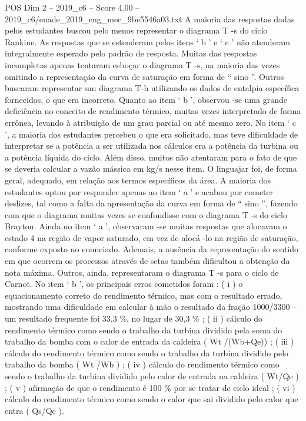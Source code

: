 \begin{textsample}{POS Dim 2 – 2019\_c6 – Score 4.00 – 2019\_c6/enade\_2019\_eng\_mec\_9be5546a03.txt}
A maioria das respostas dadas pelos estudantes buscou pelo menos representar o diagrama T -s do ciclo Rankine.
As respostas que se estenderam pelos itens ‘ b ’ e ‘ c ’ não atenderam integralmente esperado pelo padrão de resposta.
Muitas das respostas incompletas apenas tentaram esboçar o diagrama T -s, na maioria das vezes omitindo a representação da curva de saturação em forma de “ sino ”.
Outros buscaram representar um diagrama T-h utilizando os dados de entalpia específica fornecidos, o que era incorreto.
Quanto ao item ‘ b ’, observou -se uma grande deficiência no conceito de rendimento térmico, muitas vezes interpretado de forma errônea, levando à atribuição de um grau parcial ou até mesmo zero.
No item ‘ c ’, a maioria dos estudantes percebeu o que era solicitado, mas teve dificuldade de interpretar se a potência a ser utilizada nos cálculos era a potência da turbina ou a potência líquida do ciclo.
Além disso, muitos não atentaram para o fato de que se deveria calcular a vazão mássica em kg/s nesse item.
O linguajar foi, de forma geral, adequado, em relação aos termos específicos da área.
A maioria dos estudantes optou por responder apenas ao item ‘ a ’ e acabou por cometer deslizes, tal como a falta da apresentação da curva em forma de “ sino ”, fazendo com que o diagrama muitas vezes se confundisse com o diagrama T -s do ciclo Brayton.
Ainda no item ‘ a ’, observaram -se muitas respostas que alocavam o estado 4 na região de vapor saturado, em vez de alocá -lo na região de saturação, conforme exposto no enunciado.
Ademais, a ausência da representação do sentido em que ocorrem os processos através de setas também dificultou a obtenção da nota máxima.
Outros, ainda, representaram o diagrama T -s para o ciclo de Carnot.
No item ‘ b ’, os principais erros cometidos foram : ( i ) o equacionamento correto do rendimento térmico, mas com o resultado errado, mostrando uma dificuldade em calcular à mão o resultado da fração 1000/3300 – um resultado frequente foi 33,3 \%, no lugar de 30,3 \% ; ( ii ) cálculo do rendimento térmico como sendo o trabalho da turbina dividido pela soma do trabalho da bomba com o calor de entrada da caldeira ( Wt /(Wb+Qe)) ; ( iii ) cálculo do rendimento térmico como sendo o trabalho da turbina dividido pelo trabalho da bomba ( Wt /Wb ) ; ( iv ) cálculo do rendimento térmico como sendo o trabalho da turbina dividido pelo calor de entrada na caldeira ( Wt/Qe ) ; ( v ) afirmação de que o rendimento é 100 \% por se tratar de ciclo ideal ; ( vi ) cálculo do rendimento térmico como sendo o calor que sai dividido pelo calor que entra ( Qs/Qe ).

\end{textsample}
